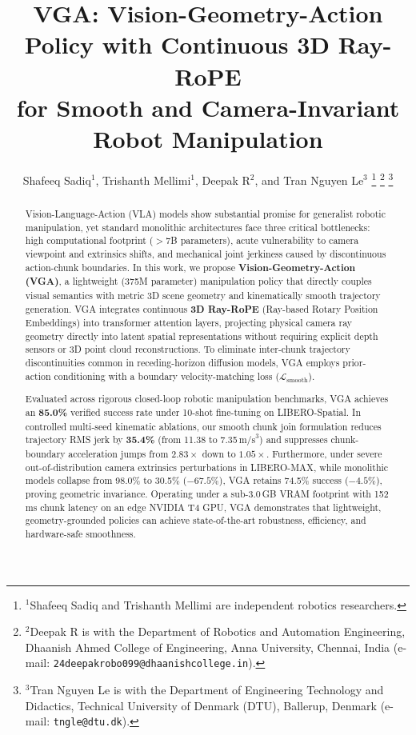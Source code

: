 \documentclass[letterpaper, 10 pt, conference]{ieeeconf}  %
\title{\LARGE 
\bf
VGA: Vision-Geometry-Action Policy with Continuous 3D Ray-RoPE \\ for Smooth and Camera-Invariant Robot Manipulation}
\author{Shafeeq Sadiq$^{1}$, Trishanth Mellimi$^{1}$, Deepak R$^{2}$, and Tran Nguyen Le$^{3}$%
\thanks{$^{1}$Shafeeq Sadiq and Trishanth Mellimi are independent robotics researchers.}%
\thanks{$^{2}$Deepak R is with the Department of Robotics and Automation Engineering, Dhaanish Ahmed College of Engineering, Anna University, Chennai, India (e-mail: {\tt\small 24deepakrobo099@dhaanishcollege.in}).}%
\thanks{$^{3}$Tran Nguyen Le is with the Department of Engineering Technology and Didactics, Technical University of Denmark (DTU), Ballerup, Denmark (e-mail: {\tt\small tngle@dtu.dk}).}%
}
\begin{document}
\maketitle
\thispagestyle{empty}
\pagestyle{empty}

\begin{abstract}
Vision-Language-Action (VLA) models show substantial promise for generalist robotic manipulation, yet standard monolithic architectures face three critical bottlenecks: high computational footprint ($>$7B parameters), acute vulnerability to camera viewpoint and extrinsics shifts, and mechanical joint jerkiness caused by discontinuous action-chunk boundaries. In this work, we propose \textbf{Vision-Geometry-Action (VGA)}, a lightweight (375M parameter) manipulation policy that directly couples visual semantics with metric 3D scene geometry and kinematically smooth trajectory generation. VGA integrates continuous \textbf{3D Ray-RoPE} (Ray-based Rotary Position Embeddings) into transformer attention layers, projecting physical camera ray geometry directly into latent spatial representations without requiring explicit depth sensors or 3D point cloud reconstructions. To eliminate inter-chunk trajectory discontinuities common in receding-horizon diffusion models, VGA employs prior-action conditioning with a boundary velocity-matching loss ($\mathcal{L}_{\text{smooth}}$). 

Evaluated across rigorous closed-loop robotic manipulation benchmarks, VGA achieves an \textbf{85.0\%} verified success rate under 10-shot fine-tuning on LIBERO-Spatial. In controlled multi-seed kinematic ablations, our smooth chunk join formulation reduces trajectory RMS jerk by \textbf{35.4\%} (from 11.38 to 7.35\,$\text{m/s}^3$) and suppresses chunk-boundary acceleration jumps from $2.83\times$ down to $1.05\times$. Furthermore, under severe out-of-distribution camera extrinsics perturbations in LIBERO-MAX, while monolithic models collapse from 98.0\% to 30.5\% ($-67.5\%$), VGA retains 74.5\% success ($-4.5\%$), proving geometric invariance. Operating under a sub-3.0\,GB VRAM footprint with 152\,ms chunk latency on an edge NVIDIA T4 GPU, VGA demonstrates that lightweight, geometry-grounded policies can achieve state-of-the-art robustness, efficiency, and hardware-safe smoothness.
\end{abstract}







\balance


\end{document}
